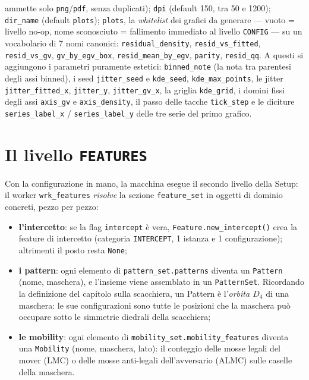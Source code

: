 \begin{itemize}
        ammette solo \texttt{png}/\texttt{pdf}, senza duplicati);
        \texttt{dpi} (default 150, tra 50 e 1200); \texttt{dir\_name}
        (default \texttt{plots}); \texttt{plots}, la \emph{whitelist} dei
        grafici da generare — vuoto = livello no-op, nome sconosciuto =
        fallimento immediato al livello \texttt{CONFIG} — su un vocabolario
        di 7 nomi canonici: \texttt{residual\_density},
        \texttt{resid\_vs\_fitted}, \texttt{resid\_vs\_gv},
        \texttt{gv\_by\_egv\_box}, \texttt{resid\_mean\_by\_egv},
        \texttt{parity}, \texttt{resid\_qq}. A questi si aggiungono i
        parametri puramente estetici: \texttt{binned\_note} (la nota tra
        parentesi degli assi binned), i seed \texttt{jitter\_seed} e
        \texttt{kde\_seed}, \texttt{kde\_max\_points}, le jitter
        \texttt{jitter\_fitted\_x}, \texttt{jitter\_y},
        \texttt{jitter\_gv\_x}, la griglia \texttt{kde\_grid}, i domini fissi
        degli assi \texttt{axis\_gv} e \texttt{axis\_density}, il passo delle
        tacche \texttt{tick\_step} e le diciture \texttt{series\_label\_x} /
        \texttt{series\_label\_y} delle tre serie del primo grafico.
\end{itemize}

\section{Il livello \texttt{FEATURES}}
\label{sec:setup-featureset-level}

Con la configurazione in mano, la macchina esegue il secondo livello della
Setup: il worker \texttt{wrk\_features} \emph{risolve} la sezione
\texttt{feature\_set} in oggetti di dominio concreti, pezzo per pezzo:

\begin{itemize}
  \item \textbf{l'intercetto}: se la flag \texttt{intercept} è vera,
        \texttt{Feature.new\_intercept()} crea la feature di intercetto
        (categoria \texttt{INTERCEPT}, 1 istanza e 1 configurazione);
        altrimenti il posto resta \texttt{None};
  \item \textbf{i pattern}: ogni elemento di \texttt{pattern\_set.patterns}
        diventa un \texttt{Pattern} (nome, maschera), e l'insieme viene
        assemblato in un \texttt{PatternSet}. Ricordando la definizione del
        capitolo sulla scacchiera, un Pattern è l'\emph{orbita $D_4$} di una
        maschera: le sue configurazioni sono tutte le posizioni che la maschera
        può occupare sotto le simmetrie diedrali della scacchiera;
  \item \textbf{le mobility}: ogni elemento di
        \texttt{mobility\_set.mobility\_features} diventa una
        \texttt{Mobility} (nome, maschera, lato): il conteggio delle mosse
        legali del mover (LMC) o delle mosse anti-legali dell'avversario
        (ALMC) sulle caselle della maschera.
\end{itemize}

